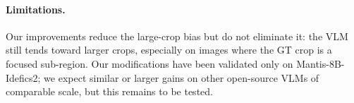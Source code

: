 \paragraph{Limitations.}
Our improvements reduce the large-crop bias but do not eliminate it:
the VLM still tends toward larger crops, especially on images where the
GT crop is a focused sub-region.  Our modifications have been validated
only on Mantis-8B-Idefics2; we expect similar or larger gains on other
open-source VLMs of comparable scale, but this remains to be tested.
